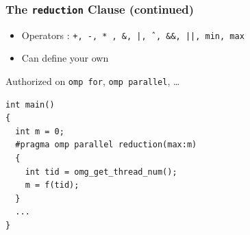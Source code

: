 \documentclass{beamer}
\begin{document}
\begin{frame}[fragile=singleslide]
  \frametitle{The \texttt{reduction} Clause (continued)}

  \begin{itemize}
  \item Operators : \verb$+, -, * , &, |, ˆ, &&, ||, min, max$
  \item Can define your own
  \end{itemize}
  
  \medskip

  Authorized on \texttt{omp for}, \texttt{omp parallel}, \dots

  \medskip
  
\begin{verbatim}
int main()
{
  int m = 0;
  #pragma omp parallel reduction(max:m)
  {
    int tid = omg_get_thread_num();
    m = f(tid);
  }
  ...
}
\end{verbatim}
\end{frame}

\end{document}
